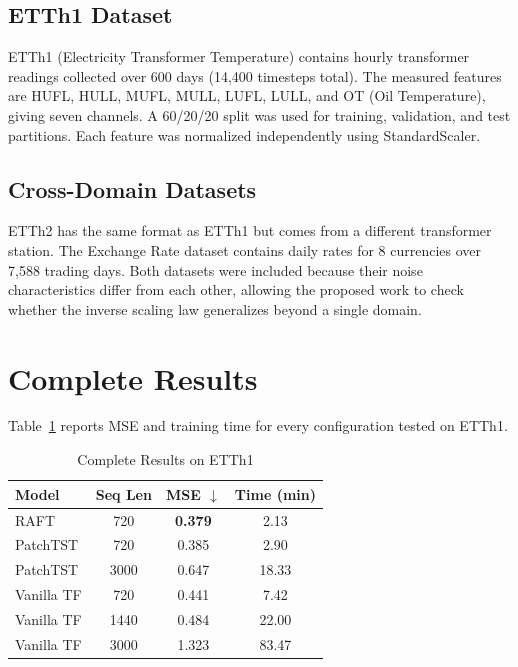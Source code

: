 \documentclass{article} %
\begin{document}
\subsection{ETTh1 Dataset}

ETTh1 (Electricity Transformer Temperature) contains hourly transformer readings collected over 600 days (14,400 timesteps total). The measured features are HUFL, HULL, MUFL, MULL, LUFL, LULL, and OT (Oil Temperature), giving seven channels. A 60/20/20 split was used for training, validation, and test partitions. Each feature was normalized independently using StandardScaler.

\subsection{Cross-Domain Datasets}

ETTh2 has the same format as ETTh1 but comes from a different transformer station. The Exchange Rate dataset contains daily rates for 8 currencies over 7,588 trading days. Both datasets were included because their noise characteristics differ from each other, allowing the proposed work to check whether the inverse scaling law generalizes beyond a single domain.

\section{Complete Results}

Table~\ref{tab:complete_results} reports MSE and training time for every configuration tested on ETTh1.

\begin{table}[h]
\centering
\caption{Complete Results on ETTh1}
\label{tab:complete_results}
\small
\begin{tabular}{lccc}
\toprule
\textbf{Model} & \textbf{Seq Len} & \textbf{MSE $\downarrow$} & \textbf{Time (min)} \\
\midrule
RAFT & 720 & \textbf{0.379} & 2.13 \\
PatchTST & 720 & 0.385 & 2.90 \\
PatchTST & 3000 & 0.647 & 18.33 \\
Vanilla TF & 720 & 0.441 & 7.42 \\
Vanilla TF & 1440 & 0.484 & 22.00 \\
Vanilla TF & 3000 & 1.323 & 83.47 \\
\bottomrule
\end{tabular}
\end{table}
\end{document}
